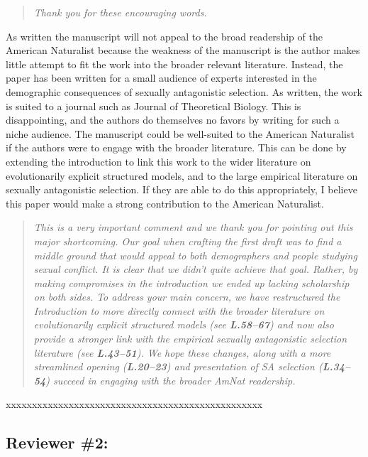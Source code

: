 \documentclass[11pt]{article}
\begin{document}
\begin{quote}
	{\itshape Thank you for these encouraging words.}
\end{quote}

As written the manuscript will not appeal to the broad readership of the American Naturalist because the weakness of the manuscript is the author makes little attempt to fit the work into the broader relevant literature. Instead, the paper has been written for a small audience of experts interested in the demographic consequences of sexually antagonistic selection. As written, the work is suited to a journal such as Journal of Theoretical Biology. This is disappointing, and the authors do themselves no favors by writing for such a niche audience. The manuscript could be well-suited to the American Naturalist if the authors were to engage with the broader literature. This can be done by extending the introduction to link this work to the wider literature on evolutionarily explicit structured models, and to the large empirical literature on sexually antagonistic selection. If they are able to do this appropriately, I believe this paper would make a strong contribution to the American Naturalist.

\begin{quote}
	{\itshape This is a very important comment and we thank you for pointing out this major shortcoming. Our goal when crafting the first draft was to find a middle ground that would appeal to both demographers and people studying sexual conflict. It is clear that we didn't quite achieve that goal. Rather, by making compromises in the introduction we ended up lacking scholarship on both sides. To address your main concern, we have restructured the Introduction to more directly connect with the broader literature on evolutionarily explicit structured models (see {\bf L.58--67}) and now also provide a stronger link with the empirical sexually antagonistic selection literature (see {\bf L.43--51}). We hope these changes, along with a more streamlined opening ({\bf L.20--23}) and presentation of SA selection ({\bf L.34--54}) succeed in engaging with the broader AmNat readership.}
\end{quote}

\noindent xxxxxxxxxxxxxxxxxxxxxxxxxxxxxxxxxxxxxxxxxxxxxxxxx


\subsection*{Reviewer \#2:}
\end{document}
